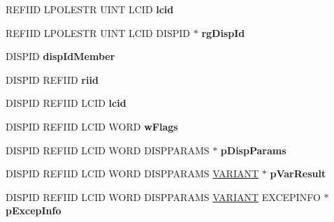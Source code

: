 \begin{DoxyCompactItemize}
\item 
\mbox{\label{struct_i_ms_tsc_debug_vtbl_a597f2aef2c1c9870a9415db6c85fbf75}} 
R\+E\+F\+I\+ID L\+P\+O\+L\+E\+S\+TR U\+I\+NT L\+C\+ID {\bfseries lcid}
\item 
\mbox{\label{struct_i_ms_tsc_debug_vtbl_affa8a771eb2952b641ea14f72502803d}} 
R\+E\+F\+I\+ID L\+P\+O\+L\+E\+S\+TR U\+I\+NT L\+C\+ID D\+I\+S\+P\+ID $\ast$ {\bfseries rg\+Disp\+Id}
\item 
\mbox{\label{struct_i_ms_tsc_debug_vtbl_ad989fecd648b333c403ccda0b65549a1}} 
D\+I\+S\+P\+ID {\bfseries disp\+Id\+Member}
\item 
\mbox{\label{struct_i_ms_tsc_debug_vtbl_a1d4422c00ed445bd14074d4e70d27ad6}} 
D\+I\+S\+P\+ID R\+E\+F\+I\+ID {\bfseries riid}
\item 
\mbox{\label{struct_i_ms_tsc_debug_vtbl_a5364abb9e2a0a2eef44966c1dab7c5ff}} 
D\+I\+S\+P\+ID R\+E\+F\+I\+ID L\+C\+ID {\bfseries lcid}
\item 
\mbox{\label{struct_i_ms_tsc_debug_vtbl_a1e1d2cdbf4e0d67323c799112e15dbd7}} 
D\+I\+S\+P\+ID R\+E\+F\+I\+ID L\+C\+ID W\+O\+RD {\bfseries w\+Flags}
\item 
\mbox{\label{struct_i_ms_tsc_debug_vtbl_ae7df5e4b69a1335825c466ee837e737d}} 
D\+I\+S\+P\+ID R\+E\+F\+I\+ID L\+C\+ID W\+O\+RD D\+I\+S\+P\+P\+A\+R\+A\+MS $\ast$ {\bfseries p\+Disp\+Params}
\item 
\mbox{\label{struct_i_ms_tsc_debug_vtbl_aaaa51d9ab066934a93dda992a83907d7}} 
D\+I\+S\+P\+ID R\+E\+F\+I\+ID L\+C\+ID W\+O\+RD D\+I\+S\+P\+P\+A\+R\+A\+MS \hyperlink{structtag_v_a_r_i_a_n_t}{V\+A\+R\+I\+A\+NT} $\ast$ {\bfseries p\+Var\+Result}
\item 
\mbox{\label{struct_i_ms_tsc_debug_vtbl_a110ecc71f0a5a552f1f90e0becd8b279}} 
D\+I\+S\+P\+ID R\+E\+F\+I\+ID L\+C\+ID W\+O\+RD D\+I\+S\+P\+P\+A\+R\+A\+MS \hyperlink{structtag_v_a_r_i_a_n_t}{V\+A\+R\+I\+A\+NT} E\+X\+C\+E\+P\+I\+N\+FO $\ast$ {\bfseries p\+Excep\+Info}

\end{DoxyCompactItemize}
